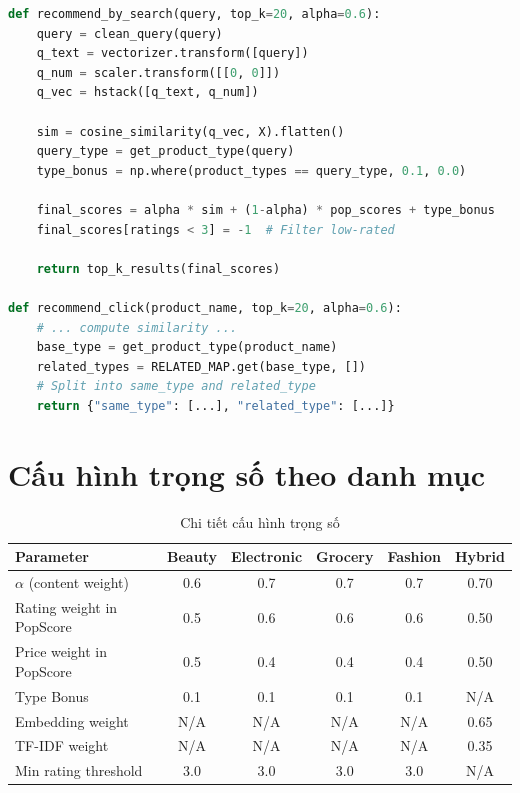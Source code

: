 \documentclass[12pt,a4paper]{report}
\begin{document}
\begin{lstlisting}[language=Python, caption=model\_beauty.py - Category Model (trích)]
def recommend_by_search(query, top_k=20, alpha=0.6):
    query = clean_query(query)
    q_text = vectorizer.transform([query])
    q_num = scaler.transform([[0, 0]])
    q_vec = hstack([q_text, q_num])
    
    sim = cosine_similarity(q_vec, X).flatten()
    query_type = get_product_type(query)
    type_bonus = np.where(product_types == query_type, 0.1, 0.0)
    
    final_scores = alpha * sim + (1-alpha) * pop_scores + type_bonus
    final_scores[ratings < 3] = -1  # Filter low-rated
    
    return top_k_results(final_scores)

def recommend_click(product_name, top_k=20, alpha=0.6):
    # ... compute similarity ...
    base_type = get_product_type(product_name)
    related_types = RELATED_MAP.get(base_type, [])
    # Split into same_type and related_type
    return {"same_type": [...], "related_type": [...]}
\end{lstlisting}

\section{Cấu hình trọng số theo danh mục}

\begin{table}[H]
\centering
\caption{Chi tiết cấu hình trọng số}
\begin{tabular}{lccccc}
\toprule
\textbf{Parameter} & \textbf{Beauty} & \textbf{Electronic} & \textbf{Grocery} & \textbf{Fashion} & \textbf{Hybrid} \\
\midrule
$\alpha$ (content weight) & 0.6 & 0.7 & 0.7 & 0.7 & 0.70 \\
Rating weight in PopScore & 0.5 & 0.6 & 0.6 & 0.6 & 0.50 \\
Price weight in PopScore & 0.5 & 0.4 & 0.4 & 0.4 & 0.50 \\
Type Bonus & 0.1 & 0.1 & 0.1 & 0.1 & N/A \\
Embedding weight & N/A & N/A & N/A & N/A & 0.65 \\
TF-IDF weight & N/A & N/A & N/A & N/A & 0.35 \\
Min rating threshold & 3.0 & 3.0 & 3.0 & 3.0 & N/A \\
\bottomrule
\end{tabular}
\end{table}
\end{document}
